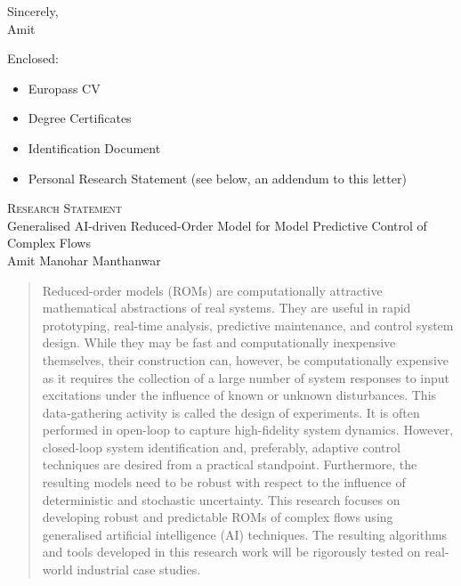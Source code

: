 \documentclass[oneside,11pt,a4paper]{article}
\begin{document}
Sincerely,\\
Amit

\vspace{4mm}
Enclosed:
\begin{itemize}[nosep,topsep=-4mm]
    \item Europass CV
    \item Degree Certificates
    \item Identification Document
    \item Personal Research Statement (see below, an addendum to this letter)
\end{itemize}
\clearpage
\pagestyle{fancy}
\begin{center}
    \small{\textsc{Research Statement}}\\[4mm]
    \huge{Generalised AI-driven Reduced-Order Model for Model Predictive Control of Complex Flows}\\[8mm]
    \large{Amit Manohar Manthanwar}
\end{center}

\begin{abstract}
    Reduced-order models (ROMs) are computationally attractive mathematical abstractions of real systems. They are useful in rapid prototyping, real-time analysis, predictive maintenance, and control system design. While they may be fast and computationally inexpensive themselves, their construction can, however, be computationally expensive as it requires the collection of a large number of system responses to input excitations under the influence of known or unknown disturbances. This data-gathering activity is called the design of experiments. It is often performed in open-loop to capture high-fidelity system dynamics. However, closed-loop system identification and, preferably, adaptive control techniques are desired from a practical standpoint. Furthermore, the resulting models need to be robust with respect to the influence of deterministic and stochastic uncertainty. This research focuses on developing robust and predictable ROMs of complex flows using generalised artificial intelligence (AI) techniques. The resulting algorithms and tools developed in this research work will be rigorously tested on real-world industrial case studies.
\end{abstract}
\end{document}
